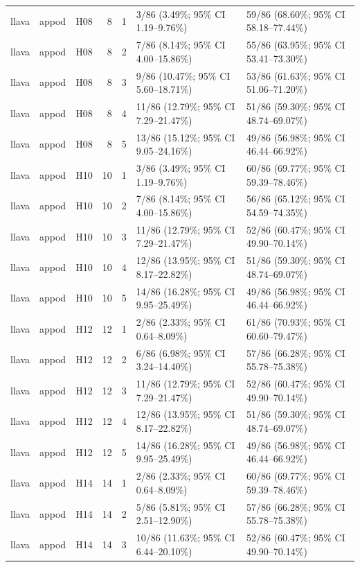 \begin{longtable}{lllrrll}
llava & appod & H08 & 8 & 1 & 3/86 (3.49\%; 95\% CI 1.19–9.76\%) & 59/86 (68.60\%; 95\% CI 58.18–77.44\%) \\
llava & appod & H08 & 8 & 2 & 7/86 (8.14\%; 95\% CI 4.00–15.86\%) & 55/86 (63.95\%; 95\% CI 53.41–73.30\%) \\
llava & appod & H08 & 8 & 3 & 9/86 (10.47\%; 95\% CI 5.60–18.71\%) & 53/86 (61.63\%; 95\% CI 51.06–71.20\%) \\
llava & appod & H08 & 8 & 4 & 11/86 (12.79\%; 95\% CI 7.29–21.47\%) & 51/86 (59.30\%; 95\% CI 48.74–69.07\%) \\
llava & appod & H08 & 8 & 5 & 13/86 (15.12\%; 95\% CI 9.05–24.16\%) & 49/86 (56.98\%; 95\% CI 46.44–66.92\%) \\
llava & appod & H10 & 10 & 1 & 3/86 (3.49\%; 95\% CI 1.19–9.76\%) & 60/86 (69.77\%; 95\% CI 59.39–78.46\%) \\
llava & appod & H10 & 10 & 2 & 7/86 (8.14\%; 95\% CI 4.00–15.86\%) & 56/86 (65.12\%; 95\% CI 54.59–74.35\%) \\
llava & appod & H10 & 10 & 3 & 11/86 (12.79\%; 95\% CI 7.29–21.47\%) & 52/86 (60.47\%; 95\% CI 49.90–70.14\%) \\
llava & appod & H10 & 10 & 4 & 12/86 (13.95\%; 95\% CI 8.17–22.82\%) & 51/86 (59.30\%; 95\% CI 48.74–69.07\%) \\
llava & appod & H10 & 10 & 5 & 14/86 (16.28\%; 95\% CI 9.95–25.49\%) & 49/86 (56.98\%; 95\% CI 46.44–66.92\%) \\
llava & appod & H12 & 12 & 1 & 2/86 (2.33\%; 95\% CI 0.64–8.09\%) & 61/86 (70.93\%; 95\% CI 60.60–79.47\%) \\
llava & appod & H12 & 12 & 2 & 6/86 (6.98\%; 95\% CI 3.24–14.40\%) & 57/86 (66.28\%; 95\% CI 55.78–75.38\%) \\
llava & appod & H12 & 12 & 3 & 11/86 (12.79\%; 95\% CI 7.29–21.47\%) & 52/86 (60.47\%; 95\% CI 49.90–70.14\%) \\
llava & appod & H12 & 12 & 4 & 12/86 (13.95\%; 95\% CI 8.17–22.82\%) & 51/86 (59.30\%; 95\% CI 48.74–69.07\%) \\
llava & appod & H12 & 12 & 5 & 14/86 (16.28\%; 95\% CI 9.95–25.49\%) & 49/86 (56.98\%; 95\% CI 46.44–66.92\%) \\
llava & appod & H14 & 14 & 1 & 2/86 (2.33\%; 95\% CI 0.64–8.09\%) & 60/86 (69.77\%; 95\% CI 59.39–78.46\%) \\
llava & appod & H14 & 14 & 2 & 5/86 (5.81\%; 95\% CI 2.51–12.90\%) & 57/86 (66.28\%; 95\% CI 55.78–75.38\%) \\
llava & appod & H14 & 14 & 3 & 10/86 (11.63\%; 95\% CI 6.44–20.10\%) & 52/86 (60.47\%; 95\% CI 49.90–70.14\%) \\

\end{longtable}
